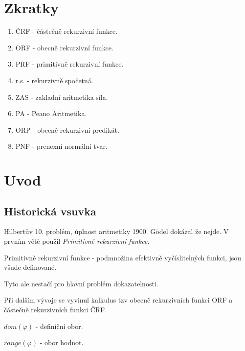 \section{\texorpdfstring{Zkratky}{Zkratky}}
\vspace{5mm}
\large

\begin{enumerate}
	\item ČRF - částečně rekurzivní funkce.
	\item ORF - obecně rekurzivní funkce.
	\item PRF - primitivně rekurzivní funkce.
	\item r.s. - rekurzivně spočetná.
	\item ZAS - zakladní aritmetika síla.
	\item PA - Peano Aritmetika.
	\item ORP - obecně rekurzivní predikát.
	\item PNF - prenexní normální tvar.
\end{enumerate}

\section{\texorpdfstring{Uvod}{Uvod}}
\vspace{5mm}
\large


\subsection{Historická vsuvka}

Hilbertův 10. problém, úplnost aritmetiky 1900.
G\"{o}del dokázal že nejde. V prvním větě použil \emph{Primitivně rekurzivní funkce}.

\begin{definition}
	Primitivně rekurzivní funkce - podmnožina efektivně vyčíslitelných funkci, jsou všude definované.
\end{definition}

Tyto ale nestačí pro hlavní problém dokazatelnosti.

Při dalším vývoje se vyvinul kalkulus tzv obecně rekurzivních funkci ORF a částečně rekurzivních funkci ČRF.

\begin{notation}
	$dom(\varphi)$ - definiční obor.
\end{notation}
\begin{notation}
	$range(\varphi)$ - obor hodnot.
\end{notation}


